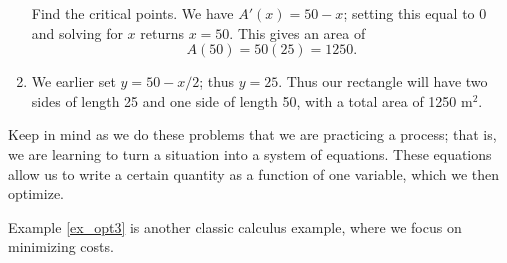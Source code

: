 \begin{example}
\begin{enumerate}
	Find the critical points. We have $A'(x) = 50-x$; setting this equal to 0 and solving for $x$ returns $x=50$. This gives an area of $$A(50) = 50(25) = 1250.$$
	\item		We earlier set $y = 50-x/2$; thus $y = 25$. Thus our rectangle will have two sides of length 25 and one side of length 50, with a total area of 1250 m$^2$.
	\end{enumerate}
\end{example}

Keep in mind as we do these problems that we are practicing a process; that is, we are learning to turn a situation into a system of equations. These equations allow us to write a certain quantity as a function of one variable, which we then optimize.


Example \ref{ex_opt3} is another classic calculus example, where we focus on minimizing costs.  

